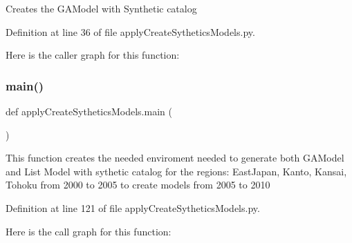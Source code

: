 \begin{DoxyVerb}Creates the GAModel with Synthetic catalog
\end{DoxyVerb}
 

Definition at line 36 of file apply\+Create\+Sythetics\+Models.\+py.

Here is the caller graph for this function\+:
\mbox{\label{namespaceapply_create_sythetics_models_ac331ebcf2141e14d7ecb9fc32ccf3e47}} 
\subsubsection{\texorpdfstring{main()}{main()}}
{\footnotesize\ttfamily def apply\+Create\+Sythetics\+Models.\+main (\begin{DoxyParamCaption}{ }\end{DoxyParamCaption})}

\begin{DoxyVerb}This function creates the needed enviroment needed to generate both GAModel and List Model  with sythetic catalog
for the regions: EastJapan, Kanto, Kansai, Tohoku
from 2000 to 2005 to create models from 2005 to 2010
\end{DoxyVerb}
 

Definition at line 121 of file apply\+Create\+Sythetics\+Models.\+py.

Here is the call graph for this function\+:
